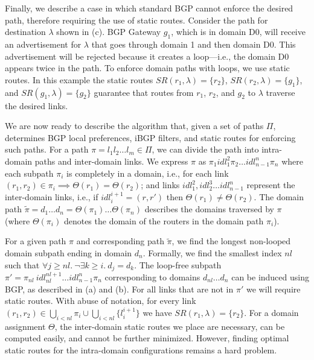 Finally, we describe a case in which standard BGP cannot enforce
the desired path, therefore requiring the use of static routes.
Consider the path for destination $\lambda$ 
shown in (c). BGP Gateway $g_1$, which is in
domain D0, 
will receive an advertisement for $\lambda$ that goes through domain
1 and then domain D0.
This advertisement will be rejected because it creates a loop---i.e., the domain D0
appears twice in the path. 
To enforce domain paths with loops, we use static routes. In this example
the static routes
$SR(r_1,\lambda) = \{r_2\}$, $SR(r_2,\lambda) = \{g_1\}$, and $SR(g_1,\lambda) = \{g_2\}$ 
guarantee that routes from $r_1$, $r_2$, and $g_2$ to $\lambda$ traverse the desired links.

We are now ready to describe the algorithm that,
given a set of paths $\Pi$, determines
BGP local preferences, iBGP filters, and static routes for enforcing such paths.
For a path $\pi = l_1 l_2 \ldots l_m \in \Pi$, we
can divide the path into intra-domain paths and inter-domain
links. We express $\pi$ as 
$\pi_1 idl_1^2 \pi_2 \ldots idl_{n-1}^n \pi_n$ where
each subpath $\pi_i$ is completely in a
domain, i.e., for each 
link $(r_1,r_2) \in \pi_i \implies \Theta(r_1) = \Theta(r_2)$;
and links $idl_1^2, idl_2^3 \ldots idl_{n-1}^n$ 
represent the inter-domain links, i.e., 
if $idl_i^{i+1}=(r,r')$ then $\Theta(r_1) \neq \Theta(r_2)$. 
The domain path
$\tilde{\pi} = d_1 \ldots d_n=\Theta(\pi_1)\ldots \Theta(\pi_n)$ describes the 
domains traversed by $\pi$ (where
$\Theta(\pi_i)$ denotes the domain of the routers in the 
domain path $\pi_i$). 


For a given path $\pi$ and corresponding path $\tilde{\pi}$,
we find the longest non-looped domain subpath ending in domain
$d_n$. Formally, we find the smallest index $nl$ such that
$\forall j \geq nl. ~\neg\exists k \geq i.~d_j = d_k$. 
The loop-free subpath $\pi'=\pi_{nl} ~idl_{nl}^{nl+1}\ldots idl_{n-1}^n \pi_n$ corresponding to
domains $d_{nl} \ldots d_n$
can be induced using BGP, as described in (a)
and (b).
For all links that are not in $\pi'$
we will require static routes.
With abuse of notation, for every link $(r_1,r_2)\in\bigcup_{i< nl} \pi_i\cup \bigcup_{i< nl}\{l_i^{i+1}\}$ 
we have
$SR(r_1, \lambda) = \{r_2\}$. 
For a domain assignment $\Theta$, the 
inter-domain static routes we place
 are necessary, can be  computed easily, and cannot be further minimized.
However, 
finding optimal static routes for the intra-domain configurations remains a
hard problem. 

